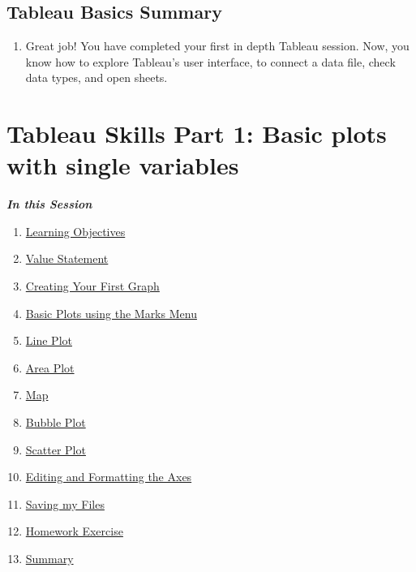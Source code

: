 \documentclass[
]{book}
\providecommand{\tightlist}{%
  \setlength{\itemsep}{0pt}\setlength{\parskip}{0pt}}
\begin{document}
\hypertarget{tableau-basics-summary}{%
\subsection{Tableau Basics Summary}\label{tableau-basics-summary}}

\begin{enumerate}
\def\labelenumi{\arabic{enumi}.}
\tightlist
\item
  Great job! You have completed your first in depth Tableau session. Now, you know how to explore Tableau's user interface, to connect a data file, check data types, and open sheets.
\end{enumerate}

\hypertarget{tableau-skills-part-1-basic-plots-with-single-variables}{%
\section{Tableau Skills Part 1: Basic plots with single variables}\label{tableau-skills-part-1-basic-plots-with-single-variables}}

\textbf{\emph{In this Session}}

\begin{enumerate}
\def\labelenumi{\arabic{enumi}.}
\tightlist
\item
  \protect\hyperlink{basic-plots-learning-objectives}{Learning Objectives}
\item
  \protect\hyperlink{value-statement}{Value Statement}
\item
  \protect\hyperlink{Creating-Your-First-Graph}{Creating Your First Graph}
\item
  \protect\hyperlink{Basic-Plots-using-the-Marks-Menu}{Basic Plots using the Marks Menu}
\item
  \protect\hyperlink{line-plot}{Line Plot}
\item
  \protect\hyperlink{area-plot}{Area Plot}
\item
  \protect\hyperlink{map}{Map}
\item
  \protect\hyperlink{bubble-plot}{Bubble Plot}
\item
  \protect\hyperlink{scatter-plot}{Scatter Plot}
\item
  \protect\hyperlink{editing-and-formatting-the-axes}{Editing and Formatting the Axes}
\item
  \protect\hyperlink{saving-my-files}{Saving my Files}
\item
  \protect\hyperlink{homework-exercise}{Homework Exercise}
\item
  \protect\hyperlink{summary}{Summary}
\end{enumerate}
\end{document}

